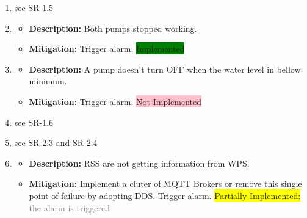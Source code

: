 \documentclass[11pt]{article}
\begin{document}
\begin{enumerate}[leftmargin=4em, font=\small, label=\textbf{H-\arabic*:}]
	\setlength\itemsep{.5em}
	\item see SR-1.5
	\item 
		\begin{itemize}
		\setlength\itemsep{0em}
    		\item \textbf{Description:} Both pumps stopped working.
    		\item \textbf{Mitigation:} Trigger alarm. \colorbox{green}{Implemented} 
		\end{itemize} 	
	\item 
		\begin{itemize}
		\setlength\itemsep{0em}
    		\item \textbf{Description:} A pump doesn't turn OFF when the water level in bellow minimum.
    		\item \textbf{Mitigation:} Trigger alarm. \colorbox{pink}{Not Implemented} 
		\end{itemize} 
	\item see SR-1.6
	\item see SR-2.3 and SR-2.4
	\item 
		\begin{itemize}
		\setlength\itemsep{0em}
    		\item \textbf{Description:} RSS are not getting information from WPS.
    		\item \textbf{Mitigation:} Implement a cluter of MQTT Brokers or remove this single point of failure by adopting DDS. Trigger alarm. \colorbox{yellow}{Partially Implemented:} \textcolor{gray}{the alarm is triggered}


\end{itemize}
\end{enumerate}
\end{document}
